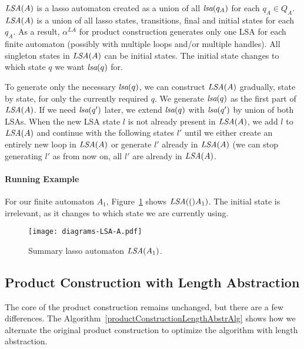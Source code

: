 $\emph{LSA}(A)$ is a lasso automaton created as a union of all $\emph{lsa}(q_A)$ for each $q_A \in Q_A$. $\emph{LSA}(A)$ is a union of all lasso states, transitions, final and initial states for each $q_A$. As a result, $\alpha^{LA}$ for product construction generates only one LSA for each finite automaton (possibly with multiple loops and/or multiple handles). All singleton states in $\emph{LSA}(A)$ can be initial states. The initial state changes to which state $q$ we want $\emph{lsa}(q)$ for.

To generate only the necessary $\emph{lsa}(q)$, we can construct $\emph{LSA}(A)$ gradually, state by state, for only the currently required $q$. We generate $\emph{lsa}(q)$ as the first part of $\emph{LSA}(A)$. If we need $\emph{lsa}(q')$ later, we extend $\emph{lsa}(q)$ with $\emph{lsa}(q')$ by union of both LSAs. When the new LSA state $l$ is not already present in $\emph{LSA}(A)$, we add $l$ to $\emph{LSA}(A)$ and continue with the following states $l'$ until we either create an entirely new loop in $\emph{LSA}(A)$ or generate $l'$ already in $\emph{LSA}(A)$ (we can stop generating $l'$ as from now on, all $l'$ are already in $\emph{LSA}(A)$.

\paragraph{Running Example}

For our finite automaton $A_1$, Figure~\ref{fig:NFA_A1_LSA_A} shows $\emph{LSA}(()A_1)$. The initial state is irrelevant, as it changes to which state we are currently using.

\begin{figure}[ht]
	\centering
	\texttt{[image: diagrams-LSA-A.pdf]}
	\caption{Summary lasso automaton $\emph{LSA}(A_1)$.}
	\label{fig:NFA_A1_LSA_A}
\end{figure}

\subsection{Product Construction with Length Abstraction}

The core of the product construction remains unchanged, but there are a few differences. The Algorithm~\ref{productConstructionLengthAbstrAlg} shows how we alternate the original product construction to optimize the algorithm with length abstraction.

